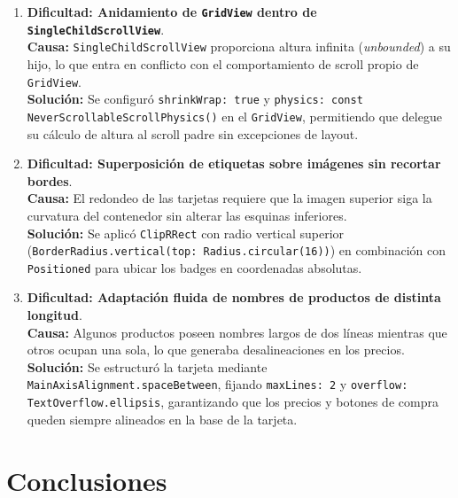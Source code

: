 \documentclass[12pt,a4paper]{article}
\begin{document}
\begin{enumerate}[leftmargin=*]
    \item \textbf{Dificultad: Anidamiento de \texttt{GridView} dentro de \texttt{SingleChildScrollView}}.\\
    \textbf{Causa:} \texttt{SingleChildScrollView} proporciona altura infinita (\textit{unbounded}) a su hijo, lo que entra en conflicto con el comportamiento de scroll propio de \texttt{GridView}.\\
    \textbf{Solución:} Se configuró \texttt{shrinkWrap: true} y \texttt{physics: const NeverScrollableScrollPhysics()} en el \texttt{GridView}, permitiendo que delegue su cálculo de altura al scroll padre sin excepciones de layout.

    \item \textbf{Dificultad: Superposición de etiquetas sobre imágenes sin recortar bordes}.\\
    \textbf{Causa:} El redondeo de las tarjetas requiere que la imagen superior siga la curvatura del contenedor sin alterar las esquinas inferiores.\\
    \textbf{Solución:} Se aplicó \texttt{ClipRRect} con radio vertical superior (\texttt{BorderRadius.vertical(top: Radius.circular(16))}) en combinación con \texttt{Positioned} para ubicar los badges en coordenadas absolutas.

    \item \textbf{Dificultad: Adaptación fluida de nombres de productos de distinta longitud}.\\
    \textbf{Causa:} Algunos productos poseen nombres largos de dos líneas mientras que otros ocupan una sola, lo que generaba desalineaciones en los precios.\\
    \textbf{Solución:} Se estructuró la tarjeta mediante \texttt{MainAxisAlignment.spaceBetween}, fijando \texttt{maxLines: 2} y \texttt{overflow: TextOverflow.ellipsis}, garantizando que los precios y botones de compra queden siempre alineados en la base de la tarjeta.
\end{enumerate}

\section{Conclusiones}
\end{document}

